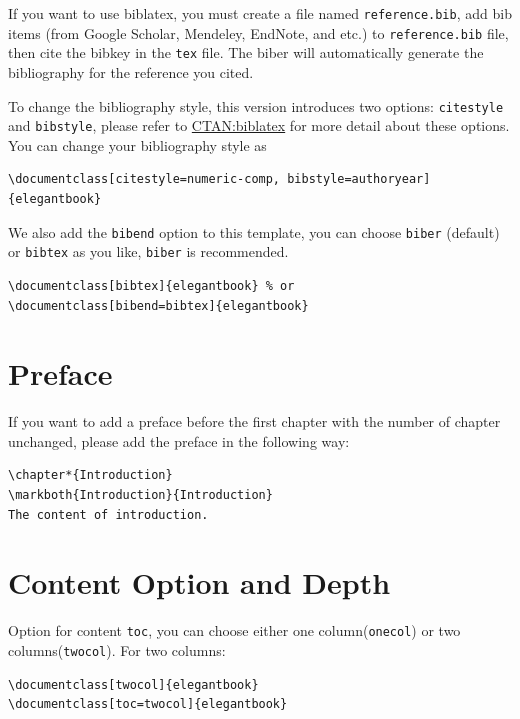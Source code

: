 \documentclass[11pt]{elegantbook}
\begin{document}
If you want to use biblatex, you must create a file named \lstinline{reference.bib}, add bib items (from Google Scholar, Mendeley, EndNote, and etc.) to \lstinline{reference.bib} file, then cite the bibkey in the \lstinline{tex} file. The biber will automatically generate the bibliography for the reference you cited.


To change the bibliography style, this version introduces two options: \lstinline{citestyle} and \lstinline{bibstyle}, please refer to \href{https://ctan.org/pkg/biblatex}{CTAN:biblatex} for more detail about these options. You can change your bibliography style as

\begin{lstlisting}
\documentclass[citestyle=numeric-comp, bibstyle=authoryear]{elegantbook} 
\end{lstlisting}

We also add the \lstinline{bibend} option to this template, you can choose \lstinline{biber} (default) or \lstinline{bibtex} as you like, \lstinline{biber} is recommended.

\begin{lstlisting}
\documentclass[bibtex]{elegantbook} % or
\documentclass[bibend=bibtex]{elegantbook}
\end{lstlisting}

\section{Preface}

If you want to add a preface before the first chapter with the number of chapter unchanged, please add the preface in the following way:
\begin{lstlisting}
\chapter*{Introduction}
\markboth{Introduction}{Introduction}
The content of introduction.
\end{lstlisting}

\section{Content Option and Depth}
Option for content \lstinline{toc}, you can  choose either one column(\lstinline{onecol}) or two columns(\lstinline{twocol}). For two columns:
\begin{lstlisting}
\documentclass[twocol]{elegantbook}
\documentclass[toc=twocol]{elegantbook}
\end{lstlisting}
\end{document}
